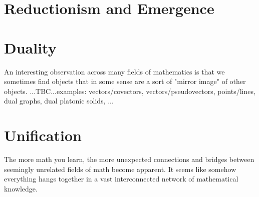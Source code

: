 \section{Reductionism and Emergence}


\section{Duality}
An interesting observation across many fields of mathematics is that we sometimes find objects that in some sense are a sort of "mirror image" of other objects. ...TBC...examples: vectors/covectors, vectors/pseudovectors, points/lines, dual graphs, dual platonic solids, ...




%

\section{Unification}
The more math you learn, the more unexpected connections and bridges between seemingly unrelated fields of math become apparent. It seems like somehow everything hangs together in a vast interconnected network of mathematical knowledge. 




\begin{comment}

-Formalism vs Intution
-Precision, Non-Ambiguity of langauge
-Automation/mechanization of thought
-Finitism, Constructivism

Unexpected connections:

The Trig Hiding Inside the Factorials (And Harmonic Numbers)
https://www.youtube.com/watch?v=-HwwY4czx_E

-Langlands program

\end{comment}